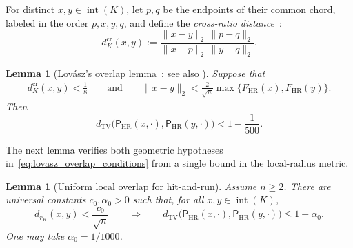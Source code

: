 \documentclass[11pt]{article}
\newtheorem{lemma}[theorem]{Lemma}
\theoremstyle{definition}
\theoremstyle{remark}
\newcommand{\dtv}{d_{\mathrm{TV}}}
\newcommand{\HRzero}{\mathsf P_{\mathrm{HR}}}
\newcommand{\HR}{\mathsf P_{\mathrm{HR}}}
\newcommand{\rK}{r_K}
\begin{document}
For distinct $x,y\in\operatorname{int}(K)$, let $p,q$ be the endpoints of
their common chord, labeled in the order $p,x,y,q$, and define the \emph{cross-ratio distance}~\cite{LovaszHR}:
\[
 d_K^{\mathrm{cr}}(x,y)
 :=
 \frac{\|x-y\|_2\,\|p-q\|_2}
      {\|x-p\|_2\,\|y-q\|_2}.
\]

\begin{lemma}[Lov\'asz's overlap lemma~{\cite[Lemma~8]{LovaszHR}}; see also {\cite[Lemma 4.1]{LV}}]\label{lem:lovasz_overlap}
Suppose that
\begin{align}\label{eq:lovasz_overlap_conditions}
 d_K^{\mathrm{cr}}(x,y)<\frac18\qquad \text{and}
 \qquad
 \|x-y\|_2
 <
 \frac2{\sqrt n}\max\{F_{\mathrm{HR}}(x),F_{\mathrm{HR}}(y)\}.
\end{align}
Then
\[
 \dtv\bigl(\HRzero(x,\cdot),\HRzero(y,\cdot)\bigr)
 <1-\frac1{500}.
\]
\end{lemma}
The next lemma verifies both geometric hypotheses in~\eqref{eq:lovasz_overlap_conditions} from a single bound in the
local-radius metric.

\begin{lemma}[Uniform local overlap for hit-and-run]
\label{lem:overlap}
Assume $n\ge2$.  There are universal constants $c_0,\alpha_0>0$ such that,
for all $x,y\in\operatorname{int}(K)$,
\begin{equation}\label{eq:local-overlap}
 d_{\rK}(x,y)<\frac{c_0}{\sqrt n}
 \qquad\Longrightarrow\qquad
 \dtv\bigl(\HR(x,\cdot),\HR(y,\cdot)\bigr)
 \le1-\alpha_0.
\end{equation}
One may take $\alpha_0=1/1000$.
\end{lemma}
\end{document}
